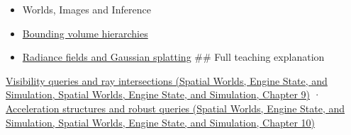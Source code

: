 \begin{itemize}
\item
  {Worlds, Images and Inference}
\item
  \hyperref[appendix-0b426c47dd78]{Bounding volume hierarchies}
\item
  \hyperref[appendix-c5b332e400e7]{Radiance fields and Gaussian splatting} \#\# Full teaching explanation
\end{itemize}

\href{../05-Spatial-Worlds-Engine-State-and-Simulation/main.pdf\#nameddest=04-visual-computing-ii-ch028-visibility-queries-and-ray-intersections-1}{Visibility queries and ray intersections (Spatial Worlds, Engine State, and Simulation, Spatial Worlds, Engine State, and Simulation, Chapter 9)} · \href{../05-Spatial-Worlds-Engine-State-and-Simulation/main.pdf\#nameddest=04-visual-computing-ii-ch029-acceleration-structures-and-robust-queries-1}{Acceleration structures and robust queries (Spatial Worlds, Engine State, and Simulation, Spatial Worlds, Engine State, and Simulation, Chapter 10)}
